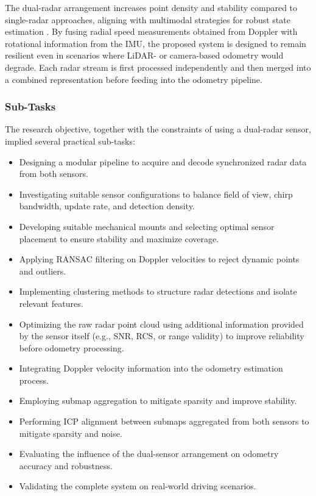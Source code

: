 The dual-radar arrangement increases point density and stability compared to single-radar approaches, aligning with multimodal strategies for robust state estimation \cite{Multimodal_Offroad,HighSpeed_Estimation}.  
By fusing radial speed measurements obtained from Doppler with rotational information from the IMU, the proposed system is designed to remain resilient even in scenarios where LiDAR- or camera-based odometry would degrade.  
Each radar stream is first processed independently and then merged into a combined representation before feeding into the odometry pipeline.  

\subsubsection{Sub-Tasks}

The research objective, together with the constraints of using a dual-radar sensor, implied several practical sub-tasks:  
\begin{itemize}
    \item Designing a modular pipeline to acquire and decode synchronized radar data from both sensors.  
    \item Investigating suitable sensor configurations to balance field of view, chirp bandwidth, update rate, and detection density.  
    \item Developing suitable mechanical mounts and selecting optimal sensor placement to ensure stability and maximize coverage.  
    \item Applying RANSAC filtering on Doppler velocities to reject dynamic points and outliers.  
    \item Implementing clustering methods to structure radar detections and isolate relevant features.  
    \item Optimizing the raw radar point cloud using additional information provided by the sensor itself (e.g., SNR, RCS, or range validity) to improve reliability before odometry processing.  
    \item Integrating Doppler velocity information into the odometry estimation process.  
    \item Employing submap aggregation to mitigate sparsity and improve stability.  
    \item Performing ICP alignment between submaps aggregated from both sensors to mitigate sparsity and noise.  
    \item Evaluating the influence of the dual-sensor arrangement on odometry accuracy and robustness.  
    \item Validating the complete system on real-world driving scenarios.  
\end{itemize}

